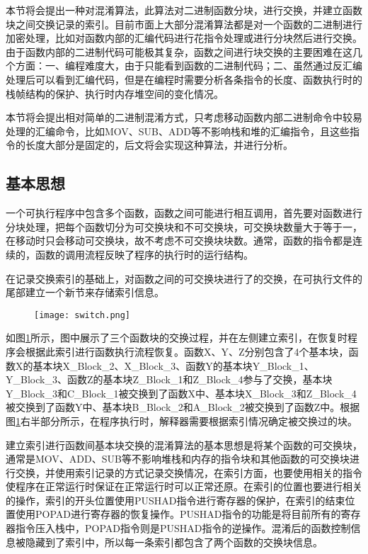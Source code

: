 本节将会提出一种对混淆算法，此算法对二进制函数分块，进行交换，并建立函数块之间交换记录的索引。目前市面上大部分混淆算法都是对一个函数的二进制进行加密处理，比如对函数内部的汇编代码进行花指令处理或进行分块然后进行交换。由于函数内部的二进制代码可能极其复杂，函数之间进行块交换的主要困难在这几个方面：一、编程难度大，由于只能看到函数的二进制代码；二、虽然通过反汇编处理后可以看到汇编代码，但是在编程时需要分析各条指令的长度、函数执行时的栈帧结构的保护、执行时内存堆空间的变化情况。

本节将会提出相对简单的二进制混淆方式，只考虑移动函数内部二进制命令中较易处理的汇编命令，比如MOV、SUB、ADD等不影响栈和堆的汇编指令，且这些指令的长度大部分是固定的，后文将会实现这种算法，并进行分析。

\subsection{基本思想} 

一个可执行程序中包含多个函数，函数之间可能进行相互调用，首先要对函数进行分块处理，把每个函数切分为可交换块和不可交换块，可交换块数量大于等于一，在移动时只会移动可交换块，故不考虑不可交换块块数。通常，函数的指令都是连续的，函数的调用流程反映了程序的执行时的运行结构。

在记录交换索引的基础上，对函数之间的可交换块进行了的交换，在可执行文件的尾部建立一个新节来存储索引信息。

\begin{figure}[htbp]
	\centering
	\texttt{[image: switch.png]}
	\label{switch}
\end{figure}

如图\ref{switch}所示，图中展示了三个函数块的交换过程，并在左侧建立索引，在恢复时程序会根据此索引进行函数执行流程恢复。函数X、Y、Z分别包含了4个基本块，函数X的基本块X\_Block\_2、X\_Block\_3、函数Y的基本块Y\_Block\_1、Y\_Block\_3、函数Z的基本块Z\_Block\_1和Z\_Block\_4参与了交换，基本块Y\_Block\_3和C\_Block\_1被交换到了函数X中、基本块X\_Block\_3和Z\_Block\_4被交换到了函数Y中、基本块B\_Block\_2和A\_Block\_2被交换到了函数Z中。根据图\ref{switch}右半部分所示，在程序执行时，解释器需要根据索引情况确定被交换过的块。

建立索引进行函数间基本块交换的混淆算法的基本思想是将某个函数的可交换块，通常是MOV、ADD、SUB等不影响堆栈和内存的指令块和其他函数的可交换块进行交换，并使用索引记录的方式记录交换情况，在索引方面，也要使用相关的指令使程序在正常运行时保证在正常运行时可以正常还原。在索引的位置也要进行相关的操作，索引的开头位置使用PUSHAD指令进行寄存器的保护，在索引的结束位置使用POPAD进行寄存器的恢复操作。PUSHAD指令的功能是将目前所有的寄存器指令压入栈中，POPAD指令则是PUSHAD指令的逆操作。混淆后的函数控制信息被隐藏到了索引中，所以每一条索引都包含了两个函数的交换块信息。

